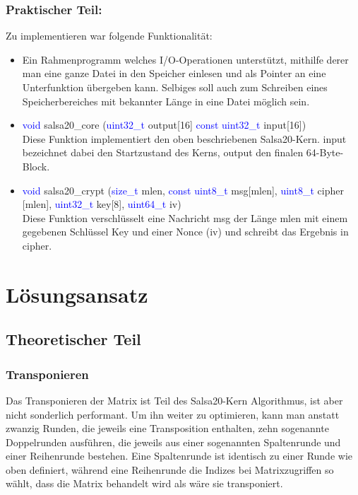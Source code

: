 \documentclass[course=erap]{aspdoc}
\begin{document}
\subsubsection{Praktischer Teil:}
Zu implementieren  war folgende Funktionalität:
\begin{itemize}
    \item Ein Rahmenprogramm welches I/O-Operationen unterstützt, mithilfe derer man eine ganze Datei in den Speicher einlesen und als Pointer an eine Unterfunktion übergeben kann. Selbiges soll auch zum Schreiben eines Speicherbereiches mit bekannter Länge in eine Datei möglich sein.
    \item \textcolor{blue}{void} salsa20\_core (\textcolor{blue} {uint32\_t} output[16] \textcolor{blue}{const uint32\_t} input[16]) \\
    Diese Funktion implementiert den oben beschriebenen Salsa20-Kern. input bezeichnet dabei den Startzustand des Kerns, output den finalen 64-Byte-Block. \\
    \item \textcolor{blue} {void} salsa20\_crypt (\textcolor{blue}{size\_t} mlen, \textcolor{blue} {const uint8\_t} msg[mlen], \textcolor{blue}{uint8\_t} cipher [mlen], \textcolor{blue}{uint32\_t} key[8], \textcolor{blue} {uint64\_t} iv) \\
    Diese Funktion verschlüsselt eine Nachricht msg der Länge mlen mit einem gegebenen Schlüssel Key und einer Nonce (iv) und schreibt das Ergebnis in cipher.
\end{itemize}



\section{Lösungsansatz}
\subsection{Theoretischer Teil}
\subsubsection{Transponieren}

Das Transponieren der Matrix ist Teil des Salsa20-Kern Algorithmus, ist aber nicht sonderlich performant.
Um ihn weiter zu optimieren, kann man anstatt zwanzig Runden, die jeweils eine Transposition enthalten, zehn sogenannte Doppelrunden
ausführen, die jeweils aus einer sogenannten Spaltenrunde und einer Reihenrunde bestehen. Eine Spaltenrunde ist identisch zu einer
Runde wie oben definiert, während eine Reihenrunde die Indizes bei Matrixzugriffen so wählt, dass die Matrix behandelt wird
als wäre sie transponiert.
\end{document}
